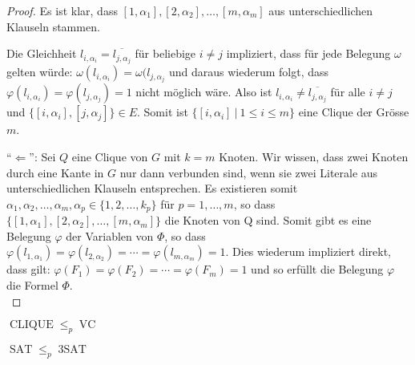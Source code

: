 \begin{proof}
Es ist klar, dass \([1, \alpha_1], [2, \alpha_2], \ldots, [m, \alpha_m]\) aus unterschiedlichen Klauseln stammen.

Die Gleichheit \(l_{i, \alpha_i} = \overline{l_{j, \alpha_j}}\) für beliebige \(i \neq j\) impliziert, dass für jede Belegung \(\omega\) gelten würde: \(\omega(l_{i, \alpha_i}) = \omega(l_{j, \alpha_j}\) und daraus wiederum folgt, dass \(\varphi(l_{i, \alpha_i}) = \varphi(l_{j, \alpha_j}) = 1\) nicht möglich wäre. Also ist \(l_{i, \alpha_i} \neq \overline{l_{j, \alpha_j}}\) für alle \(i \neq j\) und \(\{[i, \alpha_i], [j, \alpha_j]\} \in E\). Somit ist \(\{[i, \alpha_i]\ |\ 1 \leq i \leq m\}\) eine Clique der Grösse \(m\).

``\(\Leftarrow\)'': Sei \(Q\) eine Clique von \(G\) mit \(k = m\) Knoten. Wir wissen, dass zwei Knoten durch eine Kante in \(G\) nur dann verbunden sind, wenn sie zwei Literale aus unterschiedlichen Klauseln entsprechen. Es existieren somit \(\alpha_1, \alpha_2, \ldots, \alpha_m, \alpha_p \in \{1, 2, \ldots, k_p\}\) für \(p = 1, \ldots, m\), so dass \(\{ [1, \alpha_1], [2, \alpha_2], \ldots, [m, \alpha_m] \}\) die Knoten von Q sind. Somit gibt es eine Belegung \(\varphi\) der Variablen von \(\Phi\), so dass \(\varphi(l_{1, \alpha_1}) = \varphi(l_{2, \alpha_2}) = \cdots = \varphi(l_{m, \alpha_m}) = 1\). Dies wiederum impliziert direkt, dass gilt: \(\varphi(F_1) = \varphi(F_2) = \cdots = \varphi(F_m) = 1\) und so erfüllt die Belegung \(\varphi\) die Formel \(\Phi\).\\
\end{proof}

\begin{lemma}
\(\operatorname{CLIQUE} \leq_p \operatorname{VC}\)\\
\end{lemma}

\begin{lemma}
\(\operatorname{SAT} \leq_p \operatorname{3SAT}\)\\
\end{lemma}

